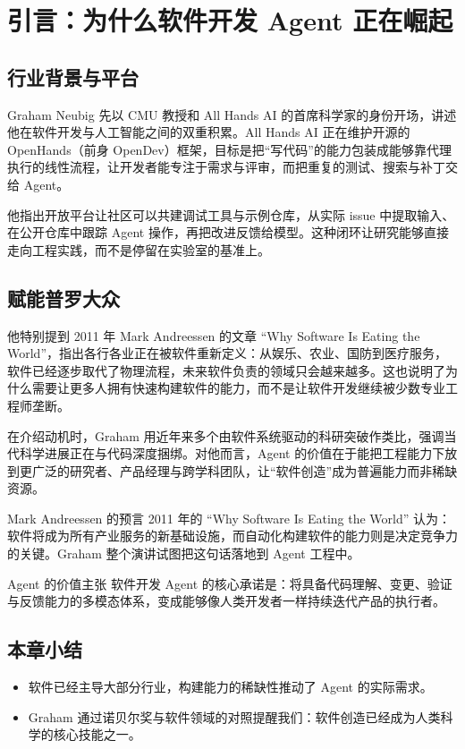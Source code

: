 \section{引言：为什么软件开发 Agent 正在崛起}
\subsection{行业背景与平台}
Graham Neubig 先以 CMU 教授和 All Hands AI 的首席科学家的身份开场，讲述他在软件开发与人工智能之间的双重积累。All Hands AI 正在维护开源的 OpenHands（前身 OpenDev）框架，目标是把“写代码”的能力包装成能够靠代理执行的线性流程，让开发者能专注于需求与评审，而把重复的测试、搜索与补丁交给 Agent。

他指出开放平台让社区可以共建调试工具与示例仓库，从实际 issue 中提取输入、在公开仓库中跟踪 Agent 操作，再把改进反馈给模型。这种闭环让研究能够直接走向工程实践，而不是停留在实验室的基准上。

\subsection{赋能普罗大众}
他特别提到 2011 年 Mark Andreessen 的文章 ``Why Software Is Eating the World''，指出各行各业正在被软件重新定义：从娱乐、农业、国防到医疗服务，软件已经逐步取代了物理流程，未来软件负责的领域只会越来越多。这也说明了为什么需要让更多人拥有快速构建软件的能力，而不是让软件开发继续被少数专业工程师垄断。

在介绍动机时，Graham 用近年来多个由软件系统驱动的科研突破作类比，强调当代科学进展正在与代码深度捆绑。对他而言，Agent 的价值在于能把工程能力下放到更广泛的研究者、产品经理与跨学科团队，让“软件创造”成为普遍能力而非稀缺资源。

\begin{knowledgebox}{Mark Andreessen 的预言}
2011 年的 ``Why Software Is Eating the World'' 认为：软件将成为所有产业服务的新基础设施，而自动化构建软件的能力则是决定竞争力的关键。Graham 整个演讲试图把这句话落地到 Agent 工程中。
\end{knowledgebox}

\begin{importantbox}{Agent 的价值主张}
软件开发 Agent 的核心承诺是：将具备代码理解、变更、验证与反馈能力的多模态体系，变成能够像人类开发者一样持续迭代产品的执行者。
\end{importantbox}

\subsection{本章小结}
\begin{itemize}
    \item 软件已经主导大部分行业，构建能力的稀缺性推动了 Agent 的实际需求。
    \item Graham 通过诺贝尔奖与软件领域的对照提醒我们：软件创造已经成为人类科学的核心技能之一。
\end{itemize}

